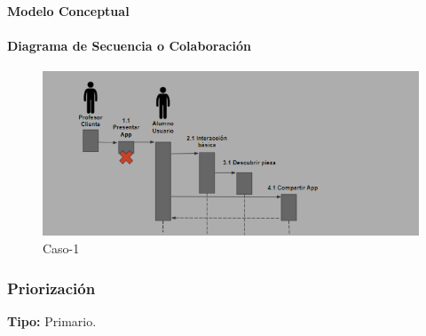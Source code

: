 \paragraph{Modelo Conceptual}


\paragraph{Diagrama de Secuencia o Colaboración}

\begin{figure}[H]
\centerline{\includegraphics[width=15cm]{imgs/CasoUso_1_2.PNG}}
\caption{Caso-1}
\label{fig}
\end{figure}

\subsubsection{Priorización}
{\textbf {Tipo:}}
Primario.